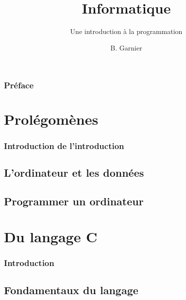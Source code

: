 \documentclass{minitelreport}
\begin{document}
	\title{Informatique}
	\subtitle{Une introduction à la programmation}
	\author{
		B. Garnier
	}
	\maketitle
\begin{refsection} %
\section*{Préface}

\tableofcontents
\listoftables
\listofdefinition
\newpage
\part{Prolégomènes}
\label{part:prol_gom_nes}
	\section*{Introduction de l'introduction}
	
	\chapter{L'ordinateur et les données}
	\label{cha:l_ordinateur_et_les_donn_es}
		
	\chapter{Programmer un ordinateur}
		\label{cha:programmer_un_ordinateur}
		
\part{Du langage C}
\label{part:du_langage_c}
	\section*{Introduction}
	
	\chapter{Fondamentaux du langage}
	\label{chap:fondamentaux_du_langage}
		

\end{refsection}
\end{document}
